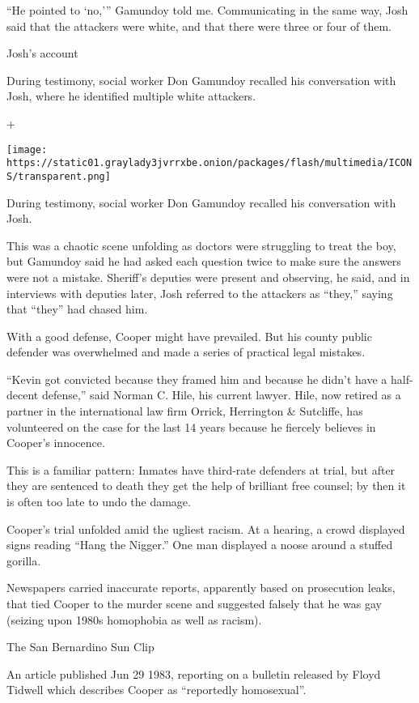 ``He pointed to `no,''' Gamundoy told me. Communicating in the same way,
Josh said that the attackers were white, and that there were three or
four of them.

Josh's account

During testimony, social worker Don Gamundoy recalled his conversation
with Josh, where he identified multiple white attackers.

+

\texttt{[image: https://static01.graylady3jvrrxbe.onion/packages/flash/multimedia/ICONS/transparent.png]}

During testimony, social worker Don Gamundoy recalled his conversation
with Josh.

This was a chaotic scene unfolding as doctors were struggling to treat
the boy, but Gamundoy said he had asked each question twice to make sure
the answers were not a mistake. Sheriff's deputies were present and
observing, he said, and in interviews with deputies later, Josh referred
to the attackers as ``they,'' saying that ``they'' had chased him.

With a good defense, Cooper might have prevailed. But his county public
defender was overwhelmed and made a series of practical legal mistakes.

``Kevin got convicted because they framed him and because he didn't have
a half-decent defense,'' said Norman C. Hile, his current lawyer. Hile,
now retired as a partner in the international law firm Orrick,
Herrington \& Sutcliffe, has volunteered on the case for the last 14
years because he fiercely believes in Cooper's innocence.

This is a familiar pattern: Inmates have third-rate defenders at trial,
but after they are sentenced to death they get the help of brilliant
free counsel; by then it is often too late to undo the damage.

Cooper's trial unfolded amid the ugliest racism. At a hearing, a crowd
displayed signs reading ``Hang the Nigger.'' One man displayed a noose
around a stuffed gorilla.

Newspapers carried inaccurate reports, apparently based on prosecution
leaks, that tied Cooper to the murder scene and suggested falsely that
he was gay (seizing upon 1980s homophobia as well as racism).

The San Bernardino Sun Clip

An article published Jun 29 1983, reporting on a bulletin released by
Floyd Tidwell which describes Cooper as ``reportedly homosexual''.

